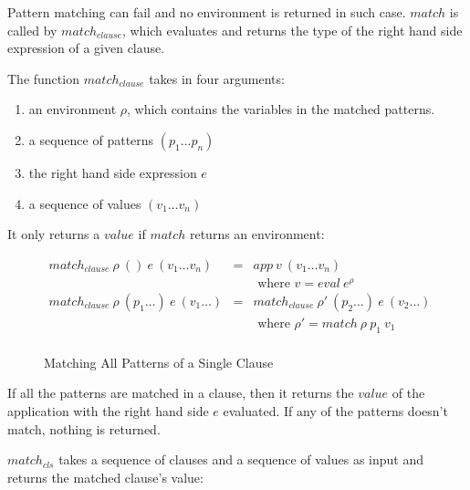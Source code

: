 \documentclass[acmsmall]{acmart}
\begin{document}
Pattern matching can fail and no environment is returned in such case. $match$ is called by $match_{clause}$, which evaluates and returns the type of the right hand side expression of a given clause.

The function $match_{clause}$ takes in four arguments:

\begin{enumerate}
  \item an environment $\rho$, which contains the variables in the matched patterns.
  \item a sequence of patterns $(p_1 \dots p_n)$
  \item the right hand side expression $e$
  \item a sequence of values $(v_1 \dots v_n)$
\end{enumerate}

It only returns a $value$ if $match$ returns an environment:

\begin{figure}[H]
  \begin{equation*}
    \begin{aligned}
      match_{clause} \: \rho \: () \: e \: (v_1 \dots v_n)      & = & app \: v \: (v_1 \dots v_n)                                \\
                                                                &   & \textrm{ where } v = eval \: e^{\rho}                      \\
      match_{clause} \: \rho \: (p_1 \dots) \: e \: (v_1 \dots) & = & match_{clause} \: \rho' \: (p_2 \dots) \: e \: (v_2 \dots) \\
                                                                &   & \textrm{ where } \rho' = match \: \rho \: p_1 \: v_1       \\                                                        
    \end{aligned}
  \end{equation*}
  \caption{Matching All Patterns of a Single Clause}
\end{figure}

If all the patterns are matched in a clause, then it returns the $value$ of the application with the right hand side $e$ evaluated. If any of the patterns doesn't match, nothing is returned.

$match_{cls}$ takes a sequence of clauses and a sequence of values as input and returns the matched clause's value:
\end{document}
